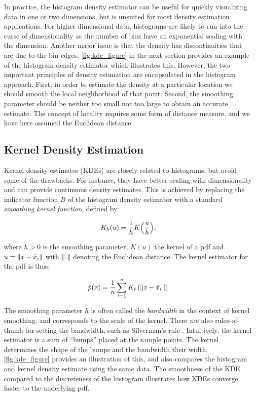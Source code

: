 In practice, the histogram density estimator can be useful for quickly visualizing data in one or two dimensions, but is unsuited for most density estimation applications. For higher dimensional data, histograms are likely to run into the curse of dimensionality as the number of bins have an exponential scaling with the dimension. Another major issue is that the density has discontinuities that are due to the bin edges. \autoref{fig:kde_figure} in the next section provides an example of the histogram density estimator which illustrates this. However, the two important principles of density estimation are encapsulated in the histogram approach. First, in order to estimate the density at a particular location we should smooth the local neighborhood of that point. Second, the smoothing parameter should be neither too small nor too large to obtain an accurate estimate. The concept of locality requires some form of distance measure, and we have here assumed the Euclidean distance.

\subsection{Kernel Density Estimation}

Kernel density estimates (KDEs) are closely related to histograms, but avoid some of the drawbacks. For instance, they have better scaling with dimensionality and can provide continuous density estimates. This is achieved by replacing the indicator function $B$ of the histogram density estimator with a standard \textit{smoothing kernel function}, defined by: 

\begin{equation}\label{eq:kernel_smooth_func}
    K_h (u) = \frac{1}{h} K \qty(\frac{u}{h}),  
\end{equation}

where $h>0$ is the smoothing parameter, $K(u)$ the kernel of a pdf and $u = \norm{x - \tilde{x}_i}$ with $\norm{\cdot}$ denoting the Euclidean distance. The kernel estimator for the pdf is thus: 

\begin{equation}\label{eq:kde}
    \hat{p}(x) = \frac{1}{n} \sum_{i=1}^n K_h \qty(\norm{x - \tilde{x}_i})
\end{equation}

The smoothing parameter $h$ is often called the \textit{bandwidth} in the context of kernel smoothing, and corresponds to the scale of the kernel. There are also rules-of-thumb for setting the bandwidth, such as Silverman's rule \cite{silverman_rule}. Intuitively, the kernel estimator is a sum of “bumps” placed at the sample points. The kernel determines the shape of the bumps and the bandwidth their width. \autoref{fig:kde_figure} provides an illustration of this, and also compares the histogram and kernel density estimate using the same data. The smoothness of the KDE compared to the discreteness of the histogram illustrates how KDEs converge faster to the underlying pdf.

